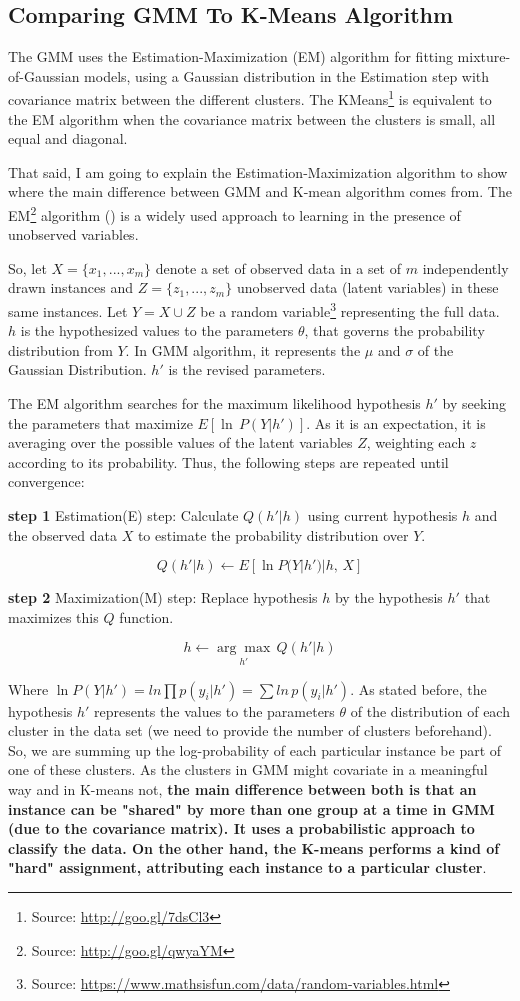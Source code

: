\documentclass[a4paper]{article}
\begin{document}
\subsection{Comparing GMM To K-Means Algorithm}

The GMM uses the Estimation-Maximization (EM) algorithm for fitting mixture-of-Gaussian models, using a Gaussian distribution in the Estimation step with covariance matrix between the different clusters. The KMeans\footnote{Source: \url{http://goo.gl/7dsCl3}} is equivalent to the EM algorithm when the covariance matrix between the clusters is small, all equal and diagonal.

That said, I am going to explain the Estimation-Maximization algorithm to show where the main difference between GMM and K-mean algorithm comes from. The EM\footnote{Source: \url{http://goo.gl/qwyaYM}} algorithm (\cite{Mitchell}) is a widely used approach to learning in the presence of unobserved variables.

So, let $X = \{x_1, ..., x_m\}$ denote a set of observed data in a set of $m$ independently drawn instances and $Z = \{z_1, ..., z_m\}$ unobserved data (latent variables) in these same instances. Let $Y = X \cup Z$ be a random variable\footnote{Source: \url{https://www.mathsisfun.com/data/random-variables.html}} representing the full data. $h$ is the hypothesized values to the parameters $\theta$, that governs the probability distribution from $Y$. In GMM algorithm, it represents the $\mu$ and $\sigma$ of the Gaussian Distribution. ${h}'$ is the revised parameters.

The EM algorithm searches for the maximum likelihood hypothesis ${h}'$ by seeking the parameters that maximize $E[\ln \, P(Y |{h}')]$. As it is an expectation, it is averaging over the possible values of the latent variables $Z$, weighting each $z$ according to its probability. Thus, the following steps are repeated until convergence:

\textbf{step 1} Estimation(E) step: Calculate $Q({h}'|h)$ using current hypothesis $h$ and the observed data $X$ to estimate the probability distribution over $Y$.

$$Q({h}'|h) \leftarrow E[\ln P(Y | {h}')| h, \, X] $$

\textbf{step 2} Maximization(M) step: Replace hypothesis $h$ by the hypothesis ${h}'$ that maximizes this $Q$ function.

$$h \leftarrow \underset{{h}'}{\arg \max} \, Q({h}'|h)$$

Where $\ln P(Y | {h}') = ln \prod p(y_i| {h}') = \sum ln\, p(y_i| {h}')$. As stated before, the hypothesis ${h}'$ represents the values to the parameters $\theta$ of the distribution of each cluster in the data set (we need to provide the number of clusters beforehand). So, we are summing up the log-probability of each particular instance be part of one of these clusters. As the clusters in GMM might covariate in a meaningful way and in K-means not, \textbf{the main difference between both is that an instance can be "shared" by more than one group at a time in GMM (due to the covariance matrix). It uses a probabilistic approach to classify the data. On the other hand, the K-means performs a kind of "hard" assignment, attributing each instance to a particular cluster}.
\end{document}
